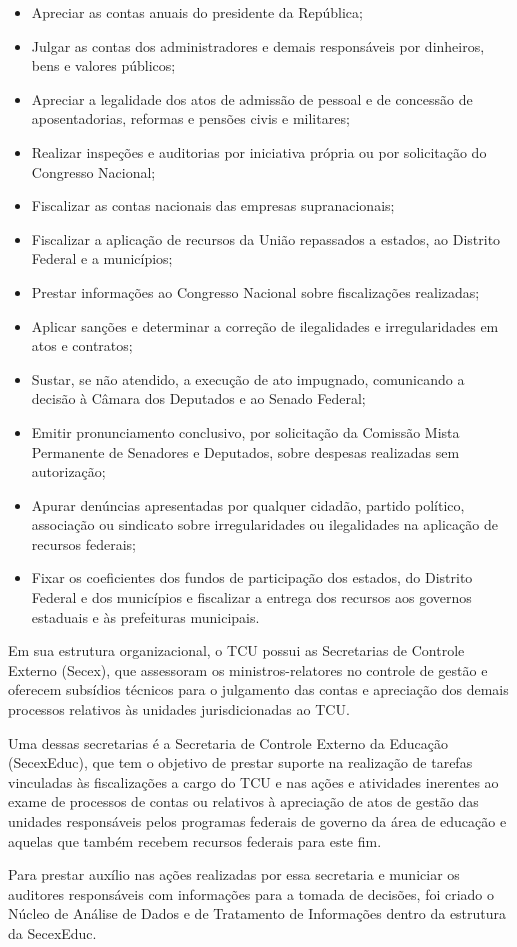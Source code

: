 \begin{itemize}
    \item Apreciar as contas anuais do presidente da República;
    \item Julgar as contas dos administradores e demais responsáveis por dinheiros, bens e 
    valores públicos;
    \item Apreciar a legalidade dos atos de admissão de pessoal e de concessão de aposentadorias, 
    reformas e pensões civis e militares;
    \item Realizar inspeções e auditorias por iniciativa própria ou por solicitação do Congresso 
    Nacional;
    \item Fiscalizar as contas nacionais das empresas supranacionais;
    \item Fiscalizar a aplicação de recursos da União repassados a estados, ao Distrito Federal 
    e a municípios;
    \item Prestar informações ao Congresso Nacional sobre fiscalizações realizadas;
    \item Aplicar sanções e determinar a correção de ilegalidades e irregularidades em atos e 
    contratos;
    \item Sustar, se não atendido, a execução de ato impugnado, comunicando a decisão à Câmara 
    dos Deputados e ao Senado Federal;
    \item Emitir pronunciamento conclusivo, por solicitação da Comissão Mista Permanente de 
    Senadores e Deputados, sobre despesas realizadas sem autorização;
    \item Apurar denúncias apresentadas por qualquer cidadão, partido político, associação ou 
    sindicato sobre irregularidades ou ilegalidades na aplicação de recursos federais;
    \item Fixar os coeficientes dos fundos de participação dos estados, do Distrito Federal e 
    dos municípios e fiscalizar a entrega dos recursos aos governos estaduais e às prefeituras 
    municipais.
\end{itemize}

Em sua estrutura organizacional, o TCU possui as Secretarias de Controle Externo (Secex), que 
assessoram os ministros-relatores no controle de gestão e oferecem subsídios técnicos para o 
julgamento das contas e apreciação dos demais processos relativos às unidades jurisdicionadas ao 
TCU. 

Uma dessas secretarias é a Secretaria de Controle Externo da Educação (SecexEduc), que tem o 
objetivo de prestar suporte na realização de tarefas vinculadas às fiscalizações a cargo do TCU e 
nas ações e atividades inerentes ao exame de processos de contas ou relativos à apreciação de atos 
de gestão das unidades responsáveis pelos programas federais de governo da área de educação e 
aquelas que também recebem recursos federais para este fim.

Para prestar auxílio nas ações realizadas por essa secretaria e municiar os auditores responsáveis 
com informações para a tomada de decisões, foi criado o Núcleo de Análise de Dados e de Tratamento 
de Informações dentro da estrutura da SecexEduc.




